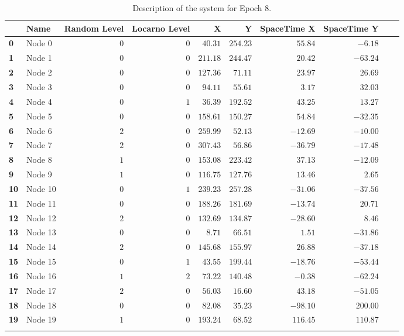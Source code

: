 \documentclass[a4paper,11pt,twoside=semi,openright]{report}
\begin{document}
\begin{table}[h]
\centering
\tiny
\begin{tabular}{@{}llrrrrrrll@{}}
\toprule
& \textbf{Name}   &\textbf{Random Level} &\textbf{Locarno Level} & \textbf{X} & \textbf{Y} & \textbf{SpaceTime X} & \textbf{SpaceTime Y}  \\ \midrule
\textbf{0} & Node 0&$0$&$0$&$40.31$&$254.23$&$55.84$&$-6.18$&\\ \hdashline
\textbf{1} & Node 1&$0$&$0$&$211.18$&$244.47$&$20.42$&$-63.24$&\\ \hdashline
\textbf{2} & Node 2&$0$&$0$&$127.36$&$71.11$&$23.97$&$26.69$&\\ \hdashline
\textbf{3} & Node 3&$0$&$0$&$94.11$&$55.61$&$3.17$&$32.03$&\\ \hdashline
\textbf{4} & Node 4&$0$&$1$&$36.39$&$192.52$&$43.25$&$13.27$&\\ \hdashline
\textbf{5} & Node 5&$0$&$0$&$158.61$&$150.27$&$54.84$&$-32.35$&\\ \hdashline
\textbf{6} & Node 6&$2$&$0$&$259.99$&$52.13$&$-12.69$&$-10.00$&\\ \hdashline
\textbf{7} & Node 7&$2$&$0$&$307.43$&$56.86$&$-36.79$&$-17.48$&\\ \hdashline
\textbf{8} & Node 8&$1$&$0$&$153.08$&$223.42$&$37.13$&$-12.09$&\\ \hdashline
\textbf{9} & Node 9&$1$&$0$&$116.75$&$127.76$&$13.46$&$2.65$&\\ \hdashline
\textbf{10} & Node 10&$0$&$1$&$239.23$&$257.28$&$-31.06$&$-37.56$&\\ \hdashline
\textbf{11} & Node 11&$0$&$0$&$188.26$&$181.69$&$-13.74$&$20.71$&\\ \hdashline
\textbf{12} & Node 12&$2$&$0$&$132.69$&$134.87$&$-28.60$&$8.46$&\\ \hdashline
\textbf{13} & Node 13&$0$&$0$&$8.71$&$66.51$&$1.51$&$-31.86$&\\ \hdashline
\textbf{14} & Node 14&$2$&$0$&$145.68$&$155.97$&$26.88$&$-37.18$&\\ \hdashline
\textbf{15} & Node 15&$0$&$1$&$43.55$&$199.44$&$-18.76$&$-53.44$&\\ \hdashline
\textbf{16} & Node 16&$1$&$2$&$73.22$&$140.48$&$-0.38$&$-62.24$&\\ \hdashline
\textbf{17} & Node 17&$2$&$0$&$56.03$&$16.60$&$43.18$&$-51.05$&\\ \hdashline
\textbf{18} & Node 18&$0$&$0$&$82.08$&$35.23$&$-98.10$&$200.00$&\\ \hdashline
\textbf{19} & Node 19&$1$&$0$&$193.24$&$68.52$&$116.45$&$110.87$&\\ \hdashline\midrule
\bottomrule
\end{tabular}
\caption{Description of the system for Epoch 8.}
\end{table}
\end{document}
